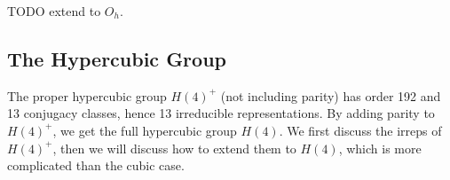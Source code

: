 \documentclass[11pt, oneside]{article}   	%
\theoremstyle{definition}
\begin{document}
TODO extend to $O_h$. 

\subsection{The Hypercubic Group}

The proper hypercubic group $H(4)^+$ (not including parity) has order 192 and 13 conjugacy classes, hence 13 irreducible 
representations. By adding parity to $H(4)^+$, we get the full hypercubic group $H(4)$. We first discuss the irreps of 
$H(4)^+$, then we will discuss how to extend them to $H(4)$, which is more complicated than the cubic case. 
\end{document}
